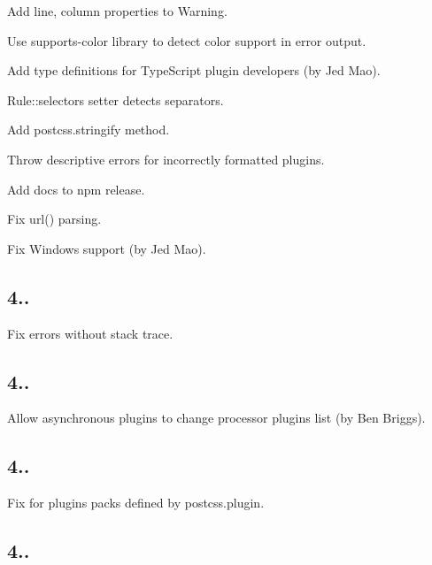 \begin{DoxyItemize}
\item Add {\ttfamily line}, {\ttfamily column} properties to {\ttfamily Warning}.
\item Use {\ttfamily supports-\/color} library to detect color support in error output.
\item Add type definitions for Type\+Script plugin developers (by Jed Mao).
\item {\ttfamily Rule\+::selectors} setter detects separators.
\item Add {\ttfamily postcss.\+stringify} method.
\item Throw descriptive errors for incorrectly formatted plugins.
\item Add docs to npm release.
\item Fix {\ttfamily url()} parsing.
\item Fix Windows support (by Jed Mao).
\end{DoxyItemize}

\subsection*{4..}


\begin{DoxyItemize}
\item Fix errors without stack trace.
\end{DoxyItemize}

\subsection*{4..}


\begin{DoxyItemize}
\item Allow asynchronous plugins to change processor plugins list (by Ben Briggs).
\end{DoxyItemize}

\subsection*{4..}


\begin{DoxyItemize}
\item Fix for plugins packs defined by {\ttfamily postcss.\+plugin}.
\end{DoxyItemize}

\subsection*{4..}


